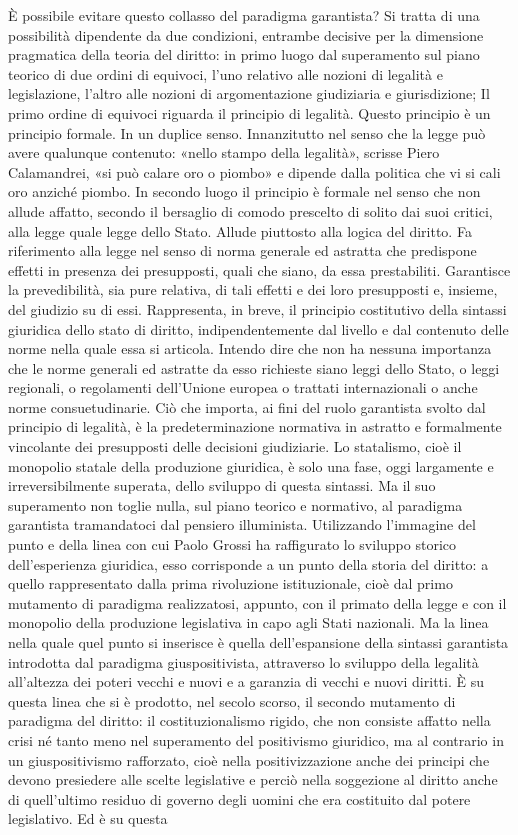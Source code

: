È possibile evitare questo collasso del paradigma garantista? Si tratta di una possibilità dipendente da due condizioni, entrambe decisive per la dimensione pragmatica della teoria del diritto: in primo luogo dal superamento sul piano teorico di due ordini di equivoci, l’uno relativo alle nozioni di legalità e legislazione, l’altro alle nozioni di argomentazione giudiziaria e giurisdizione; 
Il primo ordine di equivoci riguarda il principio di legalità. Questo principio è un principio formale. In un duplice senso. Innanzitutto nel senso che la legge può avere qualunque contenuto: «nello stampo della legalità», scrisse Piero Calamandrei, «si può calare oro o piombo» e dipende dalla politica che vi si cali oro anziché piombo. In secondo luogo il principio è formale nel senso che non allude affatto, secondo il bersaglio di comodo prescelto di solito dai suoi critici, alla legge quale legge dello Stato. Allude piuttosto alla logica del diritto. Fa riferimento alla legge nel senso di norma generale ed astratta che predispone effetti in presenza dei presupposti, quali che siano, da essa prestabiliti. Garantisce la prevedibilità, sia pure relativa, di tali effetti e dei loro presupposti e, insieme, del giudizio su di essi. Rappresenta, in breve, il principio costitutivo della sintassi giuridica dello stato di diritto, indipendentemente dal livello e dal contenuto delle norme nella quale essa si articola. Intendo dire che non ha nessuna importanza che le norme generali ed astratte da esso richieste siano leggi dello Stato, o leggi regionali, o regolamenti dell’Unione europea o trattati internazionali o anche norme consuetudinarie. Ciò che importa, ai fini del ruolo garantista svolto dal principio di legalità, è la predeterminazione normativa in astratto e formalmente vincolante dei presupposti delle decisioni giudiziarie. Lo statalismo, cioè il monopolio statale della produzione giuridica, è solo una fase, oggi largamente e irreversibilmente superata, dello sviluppo di questa sintassi. Ma il suo superamento non toglie nulla, sul piano teorico e normativo, al paradigma garantista tramandatoci dal pensiero illuminista. Utilizzando l’immagine del punto e della linea con cui Paolo Grossi ha raffigurato lo sviluppo storico dell’esperienza giuridica, esso corrisponde a un punto della storia del diritto: a quello rappresentato dalla prima rivoluzione istituzionale, cioè dal primo mutamento di paradigma realizzatosi, appunto, con il primato della legge e con il monopolio della produzione legislativa in capo agli Stati nazionali. Ma la linea nella quale quel punto si inserisce è quella dell’espansione della sintassi garantista introdotta dal paradigma giuspositivista, attraverso lo sviluppo della legalità all’altezza dei poteri vecchi e nuovi e a garanzia di vecchi e nuovi diritti. È su questa linea che si è prodotto, nel secolo scorso, il secondo mutamento di paradigma del diritto: il costituzionalismo rigido, che non consiste affatto nella crisi né tanto meno nel superamento del positivismo giuridico, ma al contrario in un giuspositivismo rafforzato, cioè nella positivizzazione anche dei principi che devono presiedere alle scelte legislative e perciò nella soggezione al diritto anche di quell’ultimo residuo di governo degli uomini che era costituito dal potere legislativo. Ed è su questa 
